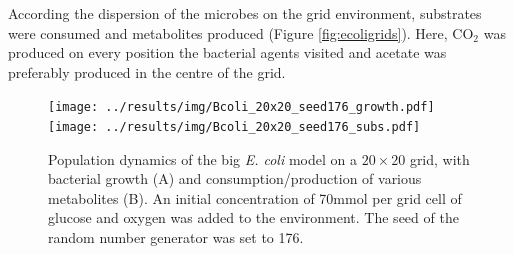 According the dispersion of the microbes on the grid environment, substrates were consumed and metabolites produced (Figure \hyperref[fig:ecoligrids]{\ref{fig:ecoligrids}}). Here, CO$_2$ was produced on every position the bacterial agents visited and  acetate was preferably produced in the centre of the grid.
\begin{figure}[h!]
  \centering
    \texttt{[image: ../results/img/Bcoli\_20x20\_seed176\_growth.pdf]}
    \texttt{[image: ../results/img/Bcoli\_20x20\_seed176\_subs.pdf]}
  \caption{Population dynamics of the big \emph{E. coli} model on a $20\times20$ grid, with bacterial growth (A) and consumption/production of various metabolites (B). An initial concentration of 70\;mmol per grid cell of glucose and oxygen was added to the environment. The seed of the random number generator was set to 176.}
  \label{fig:ecolisg}
\end{figure}
